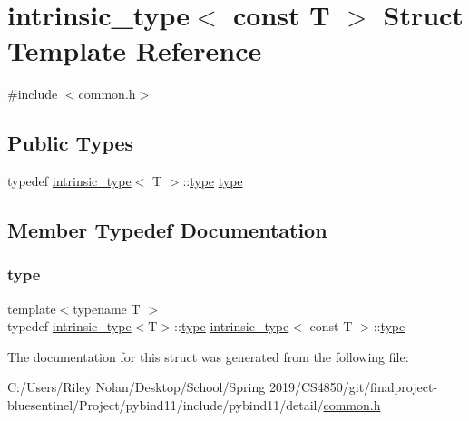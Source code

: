 \hypertarget{structintrinsic__type_3_01const_01_t_01_4}{}\section{intrinsic\+\_\+type$<$ const T $>$ Struct Template Reference}
\label{structintrinsic__type_3_01const_01_t_01_4}


{\ttfamily \#include $<$common.\+h$>$}

\subsection*{Public Types}
\begin{DoxyCompactItemize}
\item 
typedef \mbox{\hyperlink{structintrinsic__type}{intrinsic\+\_\+type}}$<$ T $>$\+::\mbox{\hyperlink{structintrinsic__type_3_01const_01_t_01_4_a977cbccc3da541d467acda18abd63a74}{type}} \mbox{\hyperlink{structintrinsic__type_3_01const_01_t_01_4_a977cbccc3da541d467acda18abd63a74}{type}}
\end{DoxyCompactItemize}


\subsection{Member Typedef Documentation}
\mbox{\label{structintrinsic__type_3_01const_01_t_01_4_a977cbccc3da541d467acda18abd63a74}} 
\subsubsection{\texorpdfstring{type}{type}}
{\footnotesize\ttfamily template$<$typename T $>$ \\
typedef \mbox{\hyperlink{structintrinsic__type}{intrinsic\+\_\+type}}$<$T$>$\+::\mbox{\hyperlink{structintrinsic__type_3_01const_01_t_01_4_a977cbccc3da541d467acda18abd63a74}{type}} \mbox{\hyperlink{structintrinsic__type}{intrinsic\+\_\+type}}$<$ const T $>$\+::\mbox{\hyperlink{structintrinsic__type_3_01const_01_t_01_4_a977cbccc3da541d467acda18abd63a74}{type}}}



The documentation for this struct was generated from the following file\+:\begin{DoxyCompactItemize}
\item 
C\+:/\+Users/\+Riley Nolan/\+Desktop/\+School/\+Spring 2019/\+C\+S4850/git/finalproject-\/bluesentinel/\+Project/pybind11/include/pybind11/detail/\mbox{\hyperlink{detail_2common_8h}{common.\+h}}\end{DoxyCompactItemize}
